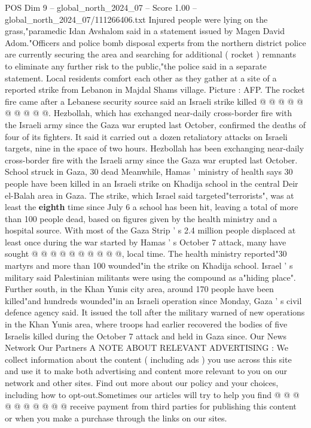 \begin{textsample}{POS Dim 9 – global\_north\_2024\_07 – Score 1.00 – global\_north\_2024\_07/111266406.txt}
Injured people were lying on the grass,"paramedic Idan Avshalom said in a statement issued by Magen David Adom."Officers and police bomb disposal experts from the northern district police are currently securing the area and searching for additional ( rocket ) remnants to eliminate any further risk to the public,"the police said in a separate statement.
Local residents comfort each other as they gather at a site of a reported strike from Lebanon in Majdal Shams village.
Picture : AFP.
The rocket fire came after a Lebanese security source said an Israeli strike killed @ @ @ @ @ @ @ @ @ @.
Hezbollah, which has exchanged near-daily cross-border fire with the Israeli army since the Gaza war erupted last October, confirmed the deaths of four of its fighters.
It said it carried out a dozen retaliatory attacks on Israeli targets, nine in the space of two hours.
Hezbollah has been exchanging near-daily cross-border fire with the Israeli army since the Gaza war erupted last October.
School struck in Gaza, 30 dead Meanwhile, Hamas ' ministry of health says 30 people have been killed in an Israeli strike on Khadija school in the central Deir el-Balah area in Gaza.
The strike, which Israel said targeted"terrorists", was at least the \textbf{eighth} time since July 6 a school has been hit, leaving a total of more than 100 people dead, based on figures given by the health ministry and a hospital source.
With most of the Gaza Strip ' s 2.4 million people displaced at least once during the war started by Hamas ' s October 7 attack, many have sought @ @ @ @ @ @ @ @ @ @, local time.
The health ministry reported"30 martyrs and more than 100 wounded"in the strike on Khadija school.
Israel ' s military said Palestinian militants were using the compound as a"hiding place".
Further south, in the Khan Yunis city area, around 170 people have been killed"and hundreds wounded"in an Israeli operation since Monday, Gaza ' s civil defence agency said.
It issued the toll after the military warned of new operations in the Khan Yunis area, where troops had earlier recovered the bodies of five Israelis killed during the October 7 attack and held in Gaza since.
Our News Network Our Partners A NOTE ABOUT RELEVANT ADVERTISING : We collect information about the content ( including ads ) you use across this site and use it to make both advertising and content more relevant to you on our network and other sites.
Find out more about our policy and your choices, including how to opt-out.Sometimes our articles will try to help you find @ @ @ @ @ @ @ @ @ @ receive payment from third parties for publishing this content or when you make a purchase through the links on our sites.

\end{textsample}
